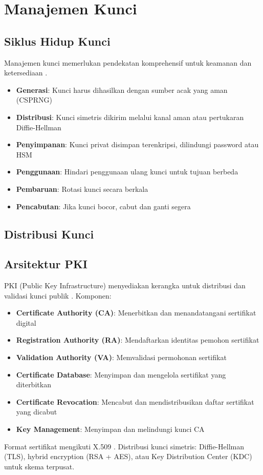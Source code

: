 ﻿\section{Manajemen Kunci}

\subsection{Siklus Hidup Kunci}

Manajemen kunci memerlukan pendekatan komprehensif untuk keamanan dan ketersediaan \cite{stallings2017}.

\begin{itemize}
  \item \textbf{Generasi}: Kunci harus dihasilkan dengan sumber acak yang aman (CSPRNG)
  \item \textbf{Distribusi}: Kunci simetris dikirim melalui kanal aman atau pertukaran Diffie-Hellman
  \item \textbf{Penyimpanan}: Kunci privat disimpan terenkripsi, dilindungi password atau HSM
  \item \textbf{Penggunaan}: Hindari penggunaan ulang kunci untuk tujuan berbeda
  \item \textbf{Pembaruan}: Rotasi kunci secara berkala
  \item \textbf{Pencabutan}: Jika kunci bocor, cabut dan ganti segera
\end{itemize}


\subsection{Distribusi Kunci}

\subsection{Arsitektur PKI}

PKI (Public Key Infrastructure) menyediakan kerangka untuk distribusi dan validasi kunci publik \cite{stallings2017}. Komponen:
\begin{itemize}
  \item \textbf{Certificate Authority (CA)}: Menerbitkan dan menandatangani sertifikat digital
  \item \textbf{Registration Authority (RA)}: Mendaftarkan identitas pemohon sertifikat
  \item \textbf{Validation Authority (VA)}: Memvalidasi permohonan sertifikat
  \item \textbf{Certificate Database}: Menyimpan dan mengelola sertifikat yang diterbitkan
  \item \textbf{Certificate Revocation}: Mencabut dan mendistribusikan daftar sertifikat yang dicabut
  \item \textbf{Key Management}: Menyimpan dan melindungi kunci CA
\end{itemize}

Format sertifikat mengikuti X.509 \cite{stallings2017}. Distribusi kunci simetris: Diffie-Hellman (TLS), hybrid encryption (RSA + AES), atau Key Distribution Center (KDC) untuk skema terpusat.


